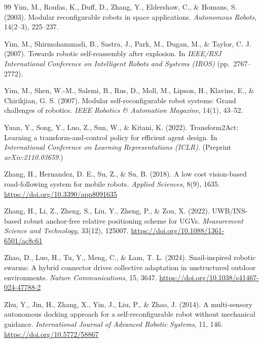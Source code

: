 \documentclass[11pt,a4paper]{article}
\begin{document}
{\begin{thebibliography}{99}
Yim, M., Roufas, K., Duff, D., Zhang, Y., Eldershaw, C., \& Homans, S. (2003).
Modular reconfigurable robots in space applications. \textit{Autonomous
Robots}, 14(2--3), 225--237.

Yim, M., Shirmohammadi, B., Sastra, J., Park, M., Dugan, M., \& Taylor, C. J.
(2007). Towards robotic self-reassembly after explosion. In \textit{IEEE/RSJ
International Conference on Intelligent Robots and Systems (IROS)}
(pp.\ 2767--2772).

Yim, M., Shen, W.-M., Salemi, B., Rus, D., Moll, M., Lipson, H., Klavins, E.,
\& Chirikjian, G. S. (2007). Modular self-reconfigurable robot systems: Grand
challenges of robotics. \textit{IEEE Robotics \& Automation Magazine}, 14(1),
43--52.

Yuan, Y., Song, Y., Luo, Z., Sun, W., \& Kitani, K. (2022). Transform2Act:
Learning a transform-and-control policy for efficient agent design. In
\textit{International Conference on Learning Representations (ICLR)}.
(Preprint \textit{arXiv:2110.03659}.)

Zhang, H., Hernandez, D. E., Su, Z., \& Su, B. (2018). A low cost vision-based
road-following system for mobile robots. \textit{Applied Sciences}, 8(9),
1635. \url{https://doi.org/10.3390/app8091635}

Zhang, H., Li, Z., Zheng, S., Liu, Y., Zheng, P., \& Zou, X. (2022). UWB/INS-%
based robust anchor-free relative positioning scheme for UGVs.
\textit{Measurement Science and Technology}, 33(12), 125007.
\url{https://doi.org/10.1088/1361-6501/ac8c61}

Zhao, D., Luo, H., Tu, Y., Meng, C., \& Lam, T. L. (2024). Snail-inspired
robotic swarms: A hybrid connector drives collective adaptation in unstructured
outdoor environments. \textit{Nature Communications}, 15, 3647.
\url{https://doi.org/10.1038/s41467-024-47788-2}

Zhu, Y., Jin, H., Zhang, X., Yin, J., Liu, P., \& Zhao, J. (2014). A
multi-sensory autonomous docking approach for a self-reconfigurable robot
without mechanical guidance. \textit{International Journal of Advanced Robotic
Systems}, 11, 146. \url{https://doi.org/10.5772/58867}

\end{thebibliography}
\let\section\oldsection
}
\end{document}
